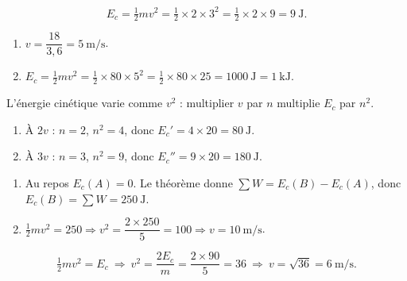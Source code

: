 \documentclass[11pt,a4paper]{article}
\begin{document}

\begin{corrige}
\[
E_c=\tfrac12 m v^2=\tfrac12\times2\times3^2=\tfrac12\times2\times9=\qty{9}{\joule}.
\]
\end{corrige}

\begin{corrige}
\begin{enumerate}[label=\alph*)]
  \item $v=\dfrac{18}{3,6}=\qty{5}{\metre\per\second}$.
  \item $E_c=\tfrac12 m v^2=\tfrac12\times80\times5^2=\tfrac12\times80\times25=\qty{1000}{\joule}=\qty{1}{\kilo\joule}$.
\end{enumerate}
\end{corrige}

\begin{corrige}
L'énergie cinétique varie comme $v^2$ : multiplier $v$ par $n$ multiplie $E_c$ par $n^2$.
\begin{enumerate}[label=\alph*)]
  \item À $2v$ : $n=2$, $n^2=4$, donc $E_c'=4\times20=\qty{80}{\joule}$.
  \item À $3v$ : $n=3$, $n^2=9$, donc $E_c''=9\times20=\qty{180}{\joule}$.
\end{enumerate}
\end{corrige}

\begin{corrige}
\begin{enumerate}[label=\alph*)]
  \item Au repos $E_c(A)=0$. Le théorème donne $\sum W=E_c(B)-E_c(A)$, donc
        $E_c(B)=\sum W=\qty{250}{\joule}$.
  \item $\tfrac12 m v^2=250\Rightarrow v^2=\dfrac{2\times250}{5}=100\Rightarrow v=\qty{10}{\metre\per\second}$.
\end{enumerate}
\end{corrige}

\begin{corrige}
\[
\tfrac12 m v^2=E_c\ \Rightarrow\ v^2=\frac{2E_c}{m}=\frac{2\times90}{5}=36\ \Rightarrow\ v=\sqrt{36}=\qty{6}{\metre\per\second}.
\]
\end{corrige}
\end{document}
